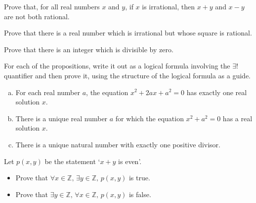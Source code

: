 \begin{exercise}
Prove that, for all real numbers $x$ and $y$, if $x$ is irrational, then $x+y$ and $x-y$ are not both rational.
\end{exercise}



\begin{exercise}
Prove that there is a real number which is irrational but whose square is rational.
\end{exercise}

\begin{exercise}
Prove that there is an integer which is divisible by zero.
\end{exercise}



\begin{exercise}
\label{exExamplesOfUniqueExistentialQuantifier}
For each of the propositions, write it out as a logical formula involving the $\exists !$ quantifier and then prove it, using the structure of the logical formula as a guide.
\begin{enumerate}[(a)]
\item For each real number $a$, the equation $x^2+2ax+a^2=0$ has exactly one real solution $x$.
\item There is a unique real number $a$ for which the equation $x^2+a^2=0$ has a real solution $x$.
\item There is a unique natural number with exactly one positive divisor.
\end{enumerate}
\end{exercise}


\begin{exercise}
Let $p(x,y)$ be the statement `$x + y$ is even'.
\begin{itemize}
\item Prove that $\forall x \in \mathbb{Z},\, \exists y \in \mathbb{Z},\, p(x,y)$ is true.
\item Prove that $\exists y \in \mathbb{Z},\, \forall x \in \mathbb{Z},\, p(x,y)$ is false.
\end{itemize}
\end{exercise}
